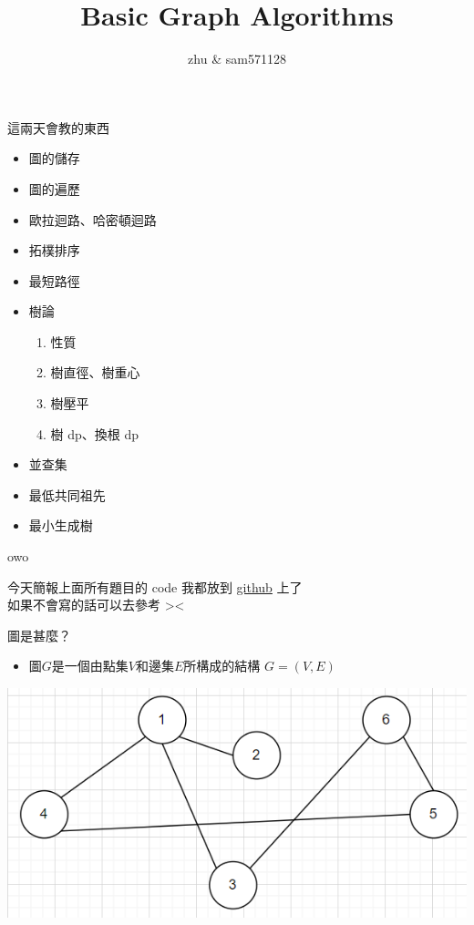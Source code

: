 \documentclass[aspectratio=169]{beamer}
\title{Basic Graph Algorithms}
\author{zhu \& sam571128}
\date[師大附中暑期培訓]
\begin{document}
    \begin{frame}
        \titlepage
    \end{frame}
    
    \begin{frame}{這兩天會教的東西}
        \begin{itemize}
            \item 圖的儲存
            \item 圖的遍歷
            \item 歐拉迴路、哈密頓迴路
            \item 拓樸排序
            \item 最短路徑
            \item 樹論
            \begin{enumerate}
                \item 性質
                \item 樹直徑、樹重心
                \item 樹壓平
                \item 樹 dp、換根 dp
            \end{enumerate}
            \item 並查集
            \item 最低共同祖先
            \item 最小生成樹
        \end{itemize}
    \end{frame}
    \begin{frame}{owo}
        \begin{center}
            今天簡報上面所有題目的 code 我都放到 \href{https://github.com/Iambamzhuuuu/Basic-Graph-Algorithm}{github} 上了\\
            如果不會寫的話可以去參考 ><
        \end{center}
    \end{frame}
    \begin{frame}{圖是甚麼？}
        \begin{itemize}
            \item 圖$G$是一個由點集$V$和邊集$E$所構成的結構 $G=(V,E)$\\
        \end{itemize}
        \vspace{2mm}
        \begin{center}
            \includegraphics[scale=0.5]{images/graph.png}
        \end{center}
    \end{frame}
    
\end{document}
